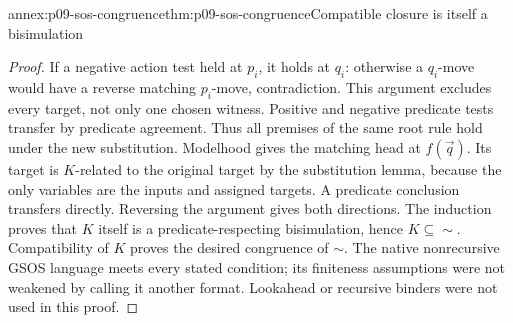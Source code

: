 \begin{annexitem}{annex:p09-sos-congruence}{thm:p09-sos-congruence}{Compatible closure is itself a bisimulation}
\begin{proof}
If a negative action test held at \(p_i\), it holds at \(q_i\):
otherwise a \(q_i\)-move would have a reverse matching
\(p_i\)-move, contradiction. This argument excludes every
target, not only one chosen witness. Positive and negative
predicate tests transfer by predicate agreement. Thus all premises
of the same root rule hold under the new substitution. Modelhood
gives the matching head at \(f(\vec q)\). Its target is
\(K\)-related to the original target by the substitution lemma,
because the only variables are the inputs and assigned targets.
A predicate conclusion transfers directly. Reversing the argument
gives both directions. The induction proves that \(K\) itself
is a predicate-respecting bisimulation, hence \(K\subseteq\sim\).
Compatibility of \(K\) proves the desired congruence of \(\sim\).
The native nonrecursive GSOS language meets every stated condition;
its finiteness assumptions were not weakened by calling it another
format. Lookahead or recursive binders were not used in this proof.
\end{proof}
\end{annexitem}

